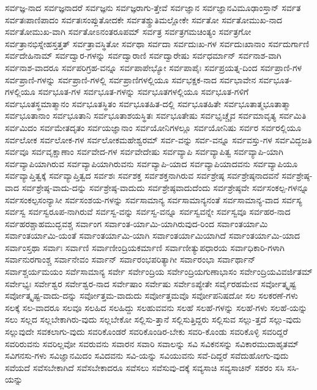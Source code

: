 {ಸರ್ವಜ್ಞ-ನಾದ
ಸರ್ವಜ್ಞನಾದರೆ
ಸರ್ವಜ್ಞನು
ಸರ್ವಜ್ಞರಾಗು-ತ್ತೇವೆ
ಸರ್ವಜ್ಞಾನ
ಸರ್ವಜ್ಞಾನವಿಮೂಢಾಂಸ್ತಾನ್
ಸರ್ವತ
ಸರ್ವತಃಪಾಣಿಪಾದಂ
ಸರ್ವತಃಸಂಪ್ಲುತೋದಕೇ
ಸರ್ವತಶ್ಶ್ರುತಿಮಲ್ಲೋಕೇ
ಸರ್ವತೋ
ಸರ್ವತೋಮುಖ-ನಾದ
ಸರ್ವತೋಮುಖ-ವಾಗಿ
ಸರ್ವತೋಽನಂತರೂಪಮ್
ಸರ್ವತ್ರ
ಸರ್ವತ್ರಗಮಚಿಂತ್ಯಂ
ಸರ್ವತ್ರಗೋ
ಸರ್ವತ್ರಾನಭಿಸ್ನೇಹಸ್ತತ್ತತ್
ಸರ್ವತ್ರಾವಸ್ಥಿತೋ
ಸರ್ವಥಾ
ಸರ್ವದಾ
ಸರ್ವದುಃಖ-ಗಳ
ಸರ್ವದುಃಖಾನಾಂ
ಸರ್ವದುರ್ಗಾಣಿ
ಸರ್ವದೇಹಿನಾಮ್
ಸರ್ವದ್ವಾರ-ಗಳನ್ನು
ಸರ್ವದ್ವಾರಾಣಿ
ಸರ್ವದ್ವಾರೇಷು
ಸರ್ವಧರ್ಮಾನ್
ಸರ್ವನಾಶ-ವಾಗಿ
ಸರ್ವನಾಶ-ವಾದರೂ
ಸರ್ವಪರಿಗ್ರಹ-ವನ್ನೂ
ಸರ್ವಪಾಪೇಭ್ಯೋ
ಸರ್ವಪಾಪೈಃ
ಸರ್ವಪ್ರಯತ್ನ-ದಿಂದ
ಸರ್ವಪ್ರಾಣಿ-ಗಳ
ಸರ್ವಪ್ರಾಣಿ-ಗಳನ್ನು
ಸರ್ವಪ್ರಾಣಿ-ಗಳಲ್ಲಿ
ಸರ್ವಪ್ರಾಣಿಗಳಲ್ಲಿಯೂ
ಸರ್ವಭಕ್ಷಕ-ನಾದ
ಸರ್ವಭಾವೇನ
ಸರ್ವಭೂತ-ಗಳಲ್ಲಿಯೂ
ಸರ್ವಭೂತ-ಗಳ
ಸರ್ವಭೂತ-ಗಳನ್ನು
ಸರ್ವಭೂತಗಳಲ್ಲಿಯೂ
ಸರ್ವಭೂತ-ಗಳಿಗೆ
ಸರ್ವಭೂತಸ್ಥಮಾತ್ಮಾನಂ
ಸರ್ವಭೂತಸ್ಥಿತಂ
ಸರ್ವಭೂತಹಿತ-ದಲ್ಲಿ
ಸರ್ವಭೂತಹಿತೇ
ಸರ್ವಭೂತಾತ್ಮಭೂತಾತ್ಮಾ
ಸರ್ವಭೂತಾನಾಂ
ಸರ್ವಭೂತಾನಿ
ಸರ್ವಭೂತಾಶಯಸ್ಥಿತಃ
ಸರ್ವಭೂತೇಷು
ಸರ್ವಭೃಚ್ಚೈವ
ಸರ್ವಮಾವೃತ್ಯ
ಸರ್ವಮಿತಿ
ಸರ್ವಮಿದಂ
ಸರ್ವಮೇತದೃತಂ
ಸರ್ವಯಜ್ಞಾನಾಂ
ಸರ್ವಯೋನಿಗಳಲ್ಲೂ
ಸರ್ವಯೋನಿಷು
ಸರ್ವರ
ಸರ್ವರಲ್ಲಿಯೂ
ಸರ್ವಲೋಕ
ಸರ್ವಲೋಕ-ಗಳ
ಸರ್ವಲೋಕಮಹೇಶ್ವರಮ್
ಸರ್ವ-ವನ್ನು
ಸರ್ವ-ವನ್ನೂ
ಸರ್ವವಸ್ತು-ಗಳ
ಸರ್ವವಿದ್ಭಜತಿ
ಸರ್ವವೂ
ಸರ್ವವೃಕ್ಷಾಣಾಂ
ಸರ್ವವೇದ-ಗಳ
ಸರ್ವವೇದೇಷು
ಸರ್ವವ್ಯಾಪಿ
ಸರ್ವವ್ಯಾಪಿತ್ವ
ಸರ್ವವ್ಯಾಪಿ-ಯಾಗಿ
ಸರ್ವವ್ಯಾಪಿಯಾಗಿರುವ
ಸರ್ವವ್ಯಾಪಿಯಾಗಿರುವನು
ಸರ್ವವ್ಯಾಪಿ-ಯಾದ
ಸರ್ವವ್ಯಾಪಿಯಾದವನು
ಸರ್ವವ್ಯಾಪಿಯೂ
ಸರ್ವವ್ಯಾಪ್ತಿತ್ವಕ್ಕೆ
ಸರ್ವವ್ಯಾಪ್ತಿತ್ವದ
ಸರ್ವಶಃ
ಸರ್ವಶಕ್ತ
ಸರ್ವಶಕ್ತನಾಗಿರುವ
ಸರ್ವಶ್ರೇಷ್ಠ
ಸರ್ವಶ್ರೇಷ್ಠನಾದವನೆ
ಸರ್ವಶ್ರೇಷ್ಠ-ವಾದ
ಸರ್ವಶ್ರೇಷ್ಠ-ವಾದು-ದನ್ನು
ಸರ್ವಶ್ರೇಷ್ಠ-ವಾದುದು
ಸರ್ವಶ್ರೇಷ್ಠವಾದುದೆಂದು
ಸರ್ವಶ್ರೇಷ್ಠವೇ
ಸರ್ವಸಂಕಲ್ಪ-ಗಳನ್ನೂ
ಸರ್ವಸಂಕಲ್ಪಸಂನ್ಯಾಸೀ
ಸರ್ವಸಂಶಯ-ಗಳನ್ನು
ಸರ್ವಸಾಮಾನ್ಯ
ಸರ್ವಸಾಮಾನ್ಯನಂತೆ
ಸರ್ವಸಾಮಾನ್ಯ-ವಾದ
ಸರ್ವಸ್ಯ
ಸರ್ವಸ್ವ
ಸರ್ವಸ್ವರೂಪ-ನಾಗಿರುವೆ
ಸರ್ವಸ್ವ-ವನ್ನು
ಸರ್ವಸ್ವ-ವನ್ನೂ
ಸರ್ವಸ್ವವನ್ನೇ
ಸರ್ವಸ್ವವೂ
ಸರ್ವಹರ-ನಾದ
ಸರ್ವಹರಶ್ಚಾಹಮುದ್ಭವಶ್ಚ
ಸರ್ವಾಂಗ
ಸರ್ವಾಂತ-ರ್ಯಾಮಿ-ಯಾಗಿರುವುದ-ರಿಂದ
ಸರ್ವಾಂತರ್ಯಾಮಿ
ಸರ್ವಾಂತರ್ಯಾಮಿ-ಯಂತೆ
ಸರ್ವಾಂತರ್ಯಾಮಿ-ಯಾಗಿ
ಸರ್ವಾಂತರ್ಯಾಮಿಯಾಗಿದೆ
ಸರ್ವಾಂತರ್ಯಾಮಿ-ಯಾದ
ಸರ್ವಾಂಸ್ತಥಾ
ಸರ್ವಾಃ
ಸರ್ವಾಣಿ
ಸರ್ವಾಣೀಂದ್ರಿಯಕರ್ಮಾಣಿ
ಸರ್ವಾಣೀತ್ಯುಪಧಾರಯ
ಸರ್ವಾಧಿಕಾರಿ-ಗಳಾಗಿ
ಸರ್ವಾನುರಗಾಂಶ್ಚ
ಸರ್ವಾನೇವಂ
ಸರ್ವಾನ್
ಸರ್ವಾರಂಭಪರಿತ್ಯಾಗೀ
ಸರ್ವಾರಂಭಾ
ಸರ್ವಾರ್ಥಾನ್
ಸರ್ವಾಶ್ಚರ್ಯಮಯಂ
ಸರ್ವೆಸಾಮಾನ್ಯ
ಸರ್ವೇ
ಸರ್ವೇಂದ್ರಿಯ
ಸರ್ವೇಂದ್ರಿಯಗುಣಾಭಾಸಂ
ಸರ್ವೇಂದ್ರಿಯವಿವರ್ಜಿತಮ್
ಸರ್ವೇಭ್ಯಃ
ಸರ್ವೇಶ್ವರ
ಸರ್ವೇಶ್ವರ-ನಾದ
ಸರ್ವೇಷಾಂ
ಸರ್ವೇಷು
ಸರ್ವೇಽಪ್ಯೇತೇ
ಸರ್ವೈರಹಮೇವ
ಸರ್ವೋತ್ಕೃಷ್ಟ
ಸರ್ವೋತ್ಕೃಷ್ಟ-ವಾದು-ದನ್ನು
ಸರ್ವೋತ್ತಮ-ವಾದುದು
ಸರ್ವೋತ್ತಮವೊ
ಸರ್ವೋಪನಿಷದೋ
ಸಲ
ಸಲಕರಣೆ-ಗಳು
ಸಲಕ್ಕೆ
ಸಲ-ವಾದರೂ
ಸಲವೂ
ಸಲಹಿದ
ಸಲಹಿದ್ದು
ಸಲಹುವವನು
ಸಲಹೆ
ಸಲಹೆ-ಗಳನ್ನು
ಸಲಹೆ-ಗಳು
ಸಲಹೆ-ಯನ್ನು
ಸಲು
ಸಲ್ಲದ
ಸಲ್ಲಬೇಕಾಗಿರು-ವುದು
ಸಲ್ಲಬೇಕೋ
ಸಲ್ಲಿಸು-ತ್ತಾನೆ
ಸಲ್ಲಿಸುತ್ತಿದ್ದರು
ಸಲ್ಲಿಸುವ
ಸಲ್ಲು-ತ್ತದೆ
ಸಲ್ಲು-ವುದು
ಸಲ್ಲುವುದೇ
ಸವಕಲಾಗು-ವುದು
ಸವರಿಕೊಂಡರೆ
ಸವರಿಕೊಂಡಿರ-ಬೇಕು
ಸವರಿ-ಕೊಂಡು
ಸವರಿಕೊಳ್ಳಿ
ಸವರಿದ್ದರೆ
ಸವರಿರುವನು
ಸವರಿಲ್ಲವೋ
ಸವರುವನು
ಸವಾರನ
ಸವಾರಿ
ಸವಾಲನ್ನು
ಸವಿ
ಸವಿಕನಸನ್ನು
ಸವಿಕಾರಮುದಾಹೃತಮ್
ಸವಿಗನಸು-ಗಳು
ಸವಿಜ್ಞಾನಮಿದಂ
ಸವಿದವನು
ಸವಿ-ಯನ್ನು
ಸವಿಯುವನು
ಸವೆ-ದಿದ್ದರೆ
ಸವೆದುಹೋಗು-ವುದು
ಸವೆಯದೆ
ಸವೆಸಬೇಕಾಗಿದೆ
ಸವೆಸಬೇಕಾದರೂ
ಸವೆಸಲು
ಸವೆಸುವು-ದಕ್ಕೆ
ಸವ್ಯಸಾಚಿ
ಸವ್ಯಸಾಚಿನ್
ಸಶರಂ
ಸಸಿ
ಸಸಿ-ಯನ್ನು
}
